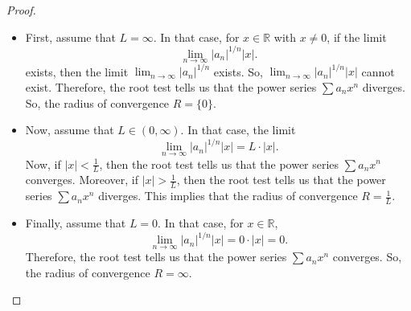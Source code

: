 \documentclass[a4paper, openany]{memoir}
\theoremstyle{definition}
\theoremstyle{plain}
\begin{document}
\begin{proof}
\hspace*{0pt}
\begin{itemize}
    \item First, assume that $L = \infty$. In that case, for $x \in \mathbb{R}$ with $x \neq 0$, if the limit
    \[\lim_{n \to \infty} |a_n|^{1/n} |x|.\]
    exists, then the limit $\lim_{n \to \infty} |a_n|^{1/n}$ exists. So, $\lim_{n \to \infty} |a_n|^{1/n} |x|$ cannot exist. Therefore, the root test tells us that the power series $\sum a_n x^n$ diverges. So, the radius of convergence $R = \{0\}$.
    
    \item Now, assume that $L \in (0, \infty)$. In that case, the limit
    \[\lim_{n \to \infty} |a_n|^{1/n} |x| = L \cdot |x|.\]
    Now, if $|x| < \frac{1}{L}$, then the root test tells us that the power series $\sum a_n x^n$ converges. Moreover, if $|x| > \frac{1}{L}$, then the root test tells us that the power series $\sum a_n x^n$ diverges. This implies that the radius of convergence $R = \frac{1}{L}$.
    
    \item Finally, assume that $L = 0$. In that case, for $x \in \mathbb{R}$,
    \[\lim_{n \to \infty} |a_n|^{1/n} |x| = 0 \cdot |x| = 0.\]
    Therefore, the root test tells us that the power series $\sum a_n x^n$ converges. So, the radius of convergence $R = \infty$.
\end{itemize}
\end{proof}
\newpage
\end{document}
